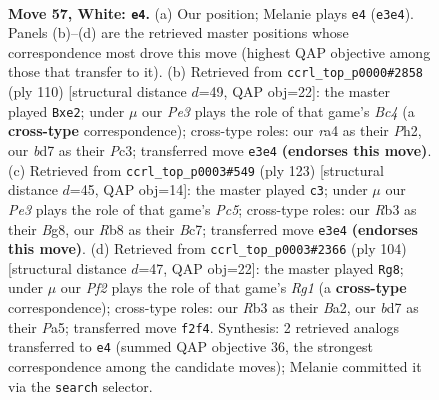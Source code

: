 \documentclass[11pt]{article}
\begin{document}
\clearpage

\begin{figure}[p]\centering
\begin{subfigure}{0.46\textwidth}\centering
\resizebox{\linewidth}{!}{%
\newchessgame
\chessboard[
  setfen={1R6/3b2k1/2r5/1p6/rn4PB/1R2P2p/5P2/7K w - - 5 57},
  showmover=false,
  pgfstyle=straightmove, color=movearrow, markmove={e3-e4}
]}
\caption{}
\end{subfigure}\hfill
\begin{subfigure}{0.46\textwidth}\centering
\resizebox{\linewidth}{!}{%
\newchessgame
\chessboard[
  setfen={5r2/8/3k4/5n1p/P1B2R2/2P2p2/1P2p2P/2K5 w - - 0 56},
  showmover=false,
  pgfstyle=straightmove, color=movearrow, markmove={c4-e2}
]}
\caption{}
\end{subfigure}
\\[4pt]
\begin{subfigure}{0.46\textwidth}\centering
\resizebox{\linewidth}{!}{%
\newchessgame
\chessboard[
  setfen={6b1/2b3k1/2P5/4P2R/p1pp1NB1/r5P1/6K1/8 b - - 0 62},
  showmover=false,
  pgfstyle=straightmove, color=movearrow, markmove={c4-c3}
]}
\caption{}
\end{subfigure}\hfill
\begin{subfigure}{0.46\textwidth}\centering
\resizebox{\linewidth}{!}{%
\newchessgame
\chessboard[
  setfen={3r4/b7/3r4/P4p2/1R1Pp3/4K3/BP5k/6R1 w - - 2 53},
  showmover=false,
  pgfstyle=straightmove, color=movearrow, markmove={g1-g8}
]}
\caption{}
\end{subfigure}
\caption{\textbf{Move 57, White: \texttt{e4}.} (a) Our position; Melanie plays \texttt{e4} (\texttt{e3e4}). Panels (b)--(d) are the retrieved master positions whose correspondence most drove this move (highest QAP objective among those that transfer to it). (b) Retrieved from \texttt{ccrl\_top\_p0000\#2858} (ply 110) [structural distance $d$=49, QAP obj=22]: the master played \texttt{Bxe2}; under $\mu$ our \emph{Pe3} plays the role of that game's \emph{Bc4} (a \textbf{cross-type} correspondence); cross-type roles: our \emph{r}a4 as their \emph{P}h2, our \emph{b}d7 as their \emph{P}c3; transferred move \texttt{e3e4} \textbf{(endorses this move)}. (c) Retrieved from \texttt{ccrl\_top\_p0003\#549} (ply 123) [structural distance $d$=45, QAP obj=14]: the master played \texttt{c3}; under $\mu$ our \emph{Pe3} plays the role of that game's \emph{Pc5}; cross-type roles: our \emph{R}b3 as their \emph{B}g8, our \emph{R}b8 as their \emph{B}c7; transferred move \texttt{e3e4} \textbf{(endorses this move)}. (d) Retrieved from \texttt{ccrl\_top\_p0003\#2366} (ply 104) [structural distance $d$=47, QAP obj=22]: the master played \texttt{Rg8}; under $\mu$ our \emph{Pf2} plays the role of that game's \emph{Rg1} (a \textbf{cross-type} correspondence); cross-type roles: our \emph{R}b3 as their \emph{B}a2, our \emph{b}d7 as their \emph{P}a5; transferred move \texttt{f2f4}. Synthesis: 2 retrieved analogs transferred to \texttt{e4} (summed QAP objective 36, the strongest correspondence among the candidate moves); Melanie committed it via the \texttt{search} selector.}
\label{fig:thought-m112}
\end{figure}
\end{document}
